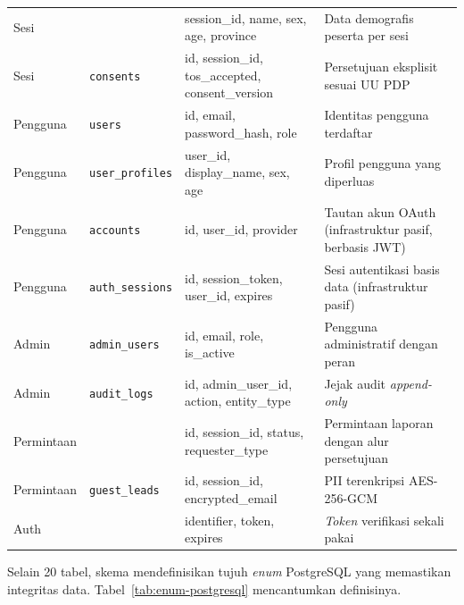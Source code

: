 \begin{xltabular}{\textwidth}{@{}p{2.3cm} p{2.8cm} p{2.8cm} >{\raggedright\arraybackslash}X@{}}
  Sesi & \texttt{} & session\_id, name, sex, age, province & Data demografis peserta per sesi \\[0.2em]
  Sesi & \texttt{consents} & id, session\_id, tos\_accepted, consent\_version & Persetujuan eksplisit sesuai UU PDP \\[0.2em]
  \midrule
  Pengguna & \texttt{users} & id, email, password\_hash, role & Identitas pengguna terdaftar \\[0.2em]
  Pengguna & \texttt{user\_profiles} & user\_id, display\_name, sex, age & Profil pengguna yang diperluas \\[0.2em]
  Pengguna & \texttt{accounts} & id, user\_id, provider & Tautan akun OAuth (infrastruktur pasif, berbasis JWT) \\[0.2em]
  Pengguna & \texttt{auth\_sessions} & id, session\_token, user\_id, expires & Sesi autentikasi basis data (infrastruktur pasif) \\[0.2em]
  \midrule
  Admin & \texttt{admin\_users} & id, email, role, is\_active & Pengguna administratif dengan peran \\[0.2em]
  Admin & \texttt{audit\_logs} & id, admin\_user\_id, action, entity\_type & Jejak audit \textit{append-only} \\[0.2em]
  \midrule
  Permintaan & \texttt{} & id, session\_id, status, requester\_type & Permintaan laporan dengan alur persetujuan \\[0.2em]
  Permintaan & \texttt{guest\_leads} & id, session\_id, encrypted\_email & PII terenkripsi AES-256-GCM \\[0.2em]
  \midrule
  Auth & \texttt{} & identifier, token, expires & \textit{Token} verifikasi sekali pakai \\
\end{xltabular}

Selain 20 tabel, skema mendefinisikan tujuh \textit{enum} PostgreSQL yang memastikan integritas data. Tabel~\ref{tab:enum-postgresql} mencantumkan definisinya.

